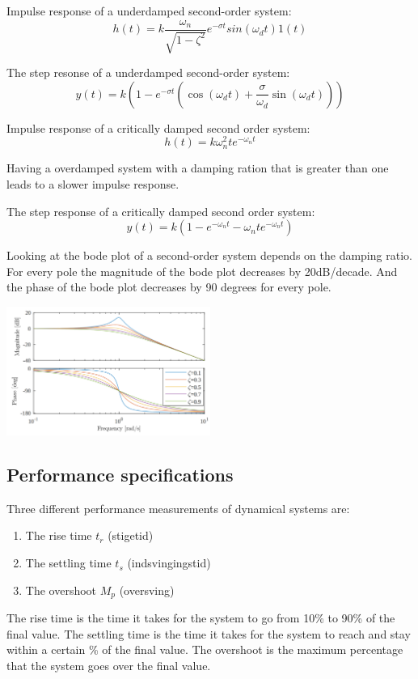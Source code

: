\newpage
Impulse response of a underdamped second-order system:
$$h(t) = k \frac{\omega_n}{\sqrt{1-\zeta ^2}} e^{-\sigma t} sin(\omega_d t) 1(t) $$

The step resonse of a underdamped second-order system:
$$y(t) = k(1-e^{-\sigma t}(\cos(\omega_d t)+\frac{\sigma}{\omega_d}\sin(\omega_d t)))$$

Impulse response of a critically damped second order system:
$$h(t) = k\omega_n^2te^{-\omega_n t}$$

Having a overdamped system with a damping ration that is greater than one leads to a slower impulse response.

The step response of a critically damped second order system:
$$y(t) = k(1-e^{-\omega_nt}-\omega_n te^{-\omega_nt})$$

Looking at the bode plot of a second-order system depends on the damping ratio.
For every pole the magnitude of the bode plot decreases by 20dB/decade.
And the phase of the bode plot decreases by 90 degrees for every pole.

\begin{center}
	\includegraphics[width=0.5\textwidth]{Images/bodeSec.png}
\end{center}


\subsection{Performance specifications}

Three different performance measurements of dynamical systems are:
\begin{enumerate}
	\item{The rise time $t_r$ (stigetid)}
	\item{The settling time $t_s$ (indsvingingstid)}
	\item{The overshoot $M_p$ (oversving)}
\end{enumerate}

The rise time is the time it takes for the system to go from 10\% to 90\% of the final value.
The settling time is the time it takes for the system to reach and stay within a certain \% of the final value.
The overshoot is the maximum percentage that the system goes over the final value.

